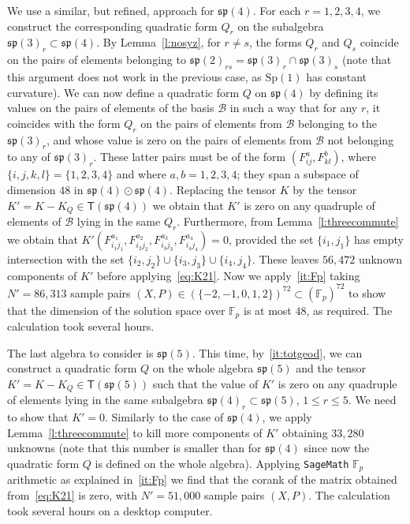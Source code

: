 \documentclass[12pt,reqno]{amsart}
\newcommand \F{\mathbb{F}}
\newcommand \Sp{\mathrm{Sp}}
\newcommand \cB{\mathcal{B}}
\newcommand \sT{\mathsf{T}}
\newcommand \spg{\mathfrak{sp}}
\newcommand \<{\langle}
\renewcommand \>{\rangle}
\theoremstyle{definition}
\theoremstyle{remark}
\begin{document}
We use a similar, but refined, approach for $\spg(4)$. For each $r=1,2,3,4$, we construct the corresponding quadratic form $Q_r$ on the subalgebra $\spg(3)_r \subset \spg(4)$. By Lemma~\ref{l:nosyz}, for $r \ne s$, the forms $Q_r$ and $Q_s$ coincide on the pairs of elements belonging to $\spg(2)_{rs} = \spg(3)_r \cap \spg(3)_s$ (note that this argument does not work in the previous case, as $\Sp(1)$ has constant curvature). We can now define a quadratic form $Q$ on $\spg(4)$ by defining its values on the pairs of elements of the basis $\cB$ in such a way that for any $r$, it coincides with the form $Q_r$ on the pairs of elements from $\cB$ belonging to the $\spg(3)_r$, and whose value is zero on the pairs of elements from $\cB$ not belonging to any of $\spg(3)_r$. These latter pairs must be of the form $(F^a_{ij}, F^b_{kl})$, where $\{i,j,k,l\}=\{1,2,3,4\}$ and where $a,b=1,2,3,4$; they span a subspace of dimension $48$ in $\spg(4) \odot \spg(4)$. Replacing the tensor $K$ by the tensor $K'=K-K_Q \in \sT(\spg(4))$ we obtain that $K'$ is zero on any quadruple of elements of $\cB$ lying in the same $Q_r$. Furthermore, from Lemma~\ref{l:threecommute} we obtain that $K'(F^{a_1}_{i_1 j_1}, F^{a_2}_{i_2 j_2}, F^{a_3}_{i_3 j_3}, F^{a_4}_{i_4 j_4}) = 0$, provided the set $\{i_1, j_1\}$ has empty intersection with the set $\{i_2, j_2\} \cup \{i_3, j_3\} \cup \{i_4, j_4\}$. These leaves $56,472$ unknown components of $K'$ before applying~\eqref{eq:K21}. Now we apply~\eqref{it:Fp} taking $N' = 86,313$ sample pairs $(X, P) \in (\{-2, -1, 0, 1, 2\})^{72} \subset (\F_p)^{72}$ to show that the dimension of the solution space over $\F_p$ is at most $48$, as required. The calculation took several hours.

The last algebra to consider is $\spg(5)$. This time, by~\eqref{it:totgeod}, we can construct a quadratic form $Q$ on the whole algebra $\spg(5)$ and the tensor $K'=K-K_Q \in \sT(\spg(5))$ such that the value of $K'$ is zero on any quadruple of elements lying in the same subalgebra $\spg(4)_r \subset \spg(5), \, 1 \le r \le 5$. We need to show that $K'=0$. Similarly to the case of $\spg(4)$, we apply Lemma~\ref{l:threecommute} to kill more components of $K'$ obtaining $33,280$ unknowns (note that this number is smaller than for $\spg(4)$ since now the quadratic form $Q$ is defined on the whole algebra). Applying \texttt{SageMath} $\F_p$ arithmetic as explained in~\eqref{it:Fp} we find that the corank of the matrix obtained from~\eqref{eq:K21} is zero, with $N' = 51,000$ sample pairs $(X, P)$. The calculation took several hours on a desktop computer.
\end{document}
